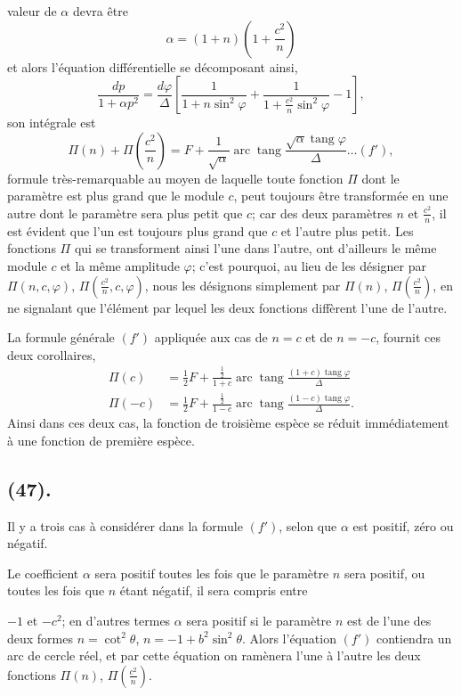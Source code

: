 \documentclass{article}
\begin{document}
valeur de $\alpha$ devra être
\[ \alpha=(1+n)\left(1+\frac{c^{2}}{n}\right) \]
et alors l'équation différentielle se décomposant ainsi,
\[ \frac{dp}{1+\alpha p^{2}}=\frac{d\varphi}{\Delta}\left[\frac{1}{1+n\sin^{2}\varphi}+\frac{1}{1+\frac{c^{2}}{n}\sin^{2}\varphi}-1\right], \]
son intégrale est
\[ \Pi(n)+\Pi\left(\frac{c^{2}}{n}\right)=F+\frac{1}{\sqrt{\alpha}}\operatorname{arc}\operatorname{tang}\frac{\sqrt{\alpha}\operatorname{tang}\varphi}{\Delta}\ldots(f'), \]
formule très-remarquable au moyen de laquelle toute fonction $\Pi$ dont le paramètre est plus grand que le module $c$, peut toujours être transformée en une autre dont le paramètre sera plus petit que $c$; car des deux paramètres $n$ et $\frac{c^{2}}{n}$, il est évident que l'un est toujours plus grand que $c$ et l'autre plus petit. Les fonctions $\Pi$ qui se transforment ainsi l'une dans l'autre, ont d'ailleurs le même module $c$ et la même amplitude $\varphi$; c'est pourquoi, au lieu de les désigner par $\Pi(n,c,\varphi)$, $\Pi\left(\frac{c^{2}}{n},c,\varphi\right)$, nous les désignons simplement par $\Pi(n)$, $\Pi\left(\frac{c^{2}}{n}\right)$, en ne signalant que l'élément par lequel les deux fonctions diffèrent l'une de l'autre.

La formule générale $(f')$ appliquée aux cas de $n=c$ et de $n=-c$, fournit ces deux corollaires,
\[ \begin{aligned} \Pi(c)&=\tfrac{1}{2}F+\frac{\frac{1}{2}}{1+c}\operatorname{arc}\operatorname{tang}\frac{(1+c)\operatorname{tang}\varphi}{\Delta}\\ \Pi(-c)&=\tfrac{1}{2}F+\frac{\frac{1}{2}}{1-c}\operatorname{arc}\operatorname{tang}\frac{(1-c)\operatorname{tang}\varphi}{\Delta}. \end{aligned} \]
Ainsi dans ces deux cas, la fonction de troisième espèce se réduit immédiatement à une fonction de première espèce.

\subsection*{(47).}

Il y a trois cas à considérer dans la formule $(f')$, selon que $\alpha$ est positif, zéro ou négatif.

Le coefficient $\alpha$ sera positif toutes les fois que le paramètre $n$ sera positif, ou toutes les fois que $n$ étant négatif, il sera compris entre

$-1$ et $-c^{2}$; en d'autres termes $\alpha$ sera positif si le paramètre $n$ est de l'une des deux formes $n=\cot^{2}\theta$, $n=-1+b^{2}\sin^{2}\theta$. Alors l'équation $(f')$ contiendra un arc de cercle réel, et par cette équation on ramènera l'une à l'autre les deux fonctions $\Pi(n)$, $\Pi\left(\frac{c^{2}}{n}\right)$.
\end{document}
